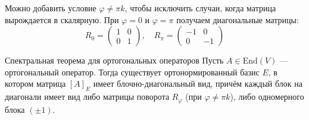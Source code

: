 \begin{Remark}{}{}
	Можно добавить условие $\varphi \neq \pi k$, чтобы исключить случаи, когда матрица вырождается в скалярную.
	При $\varphi = 0$ и $\varphi = \pi$ получаем диагональные матрицы:
	\[
	R_0 = \begin{pmatrix} 1 & 0 \\ 0 & 1 \end{pmatrix}, \quad R_\pi = \begin{pmatrix} -1 & 0 \\ 0 & -1 \end{pmatrix}
	\] 
\end{Remark}

\begin{Theorem}{Спектральная теорема для ортогональных операторов}{}
	Пусть $A \in \mathrm{End}(V)$ — ортогональный оператор.
	Тогда существует ортонормированный базис $E$, в котором матрица $[A]_E$ имеет блочно-диагональный вид, причём каждый блок на диагонали имеет вид либо матрицы поворота $R_\varphi$ (при $\varphi \neq \pi k$), либо одномерного блока $(\pm 1)$.
\end{Theorem}
